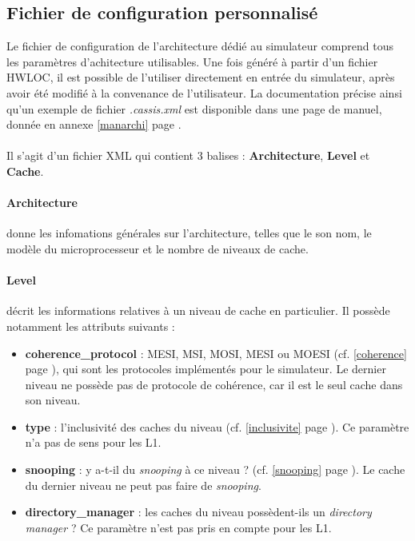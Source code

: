 \subsection{Fichier de configuration personnalisé}
\label{config}
Le fichier de configuration de l'architecture dédié au simulateur comprend tous les paramètres d'achitecture utilisables. Une fois généré à partir d'un fichier \textsf{HWLOC}, il est possible de l'utiliser directement en entrée du simulateur, après avoir été modifié à la convenance de l'utilisateur. La documentation précise ainsi qu'un exemple de fichier \textit{.cassis.xml} est disponible dans une page de manuel, donnée en annexe \ref{manarchi} page \pageref{manarchi}.

\paragraph{}
Il s'agit d'un fichier XML qui contient 3 balises : \textbf{Architecture}, \textbf{Level} et \textbf{Cache}.

\paragraph{Architecture} donne les infomations générales sur l'architecture, telles que le son nom, le modèle du microprocesseur et le nombre de niveaux de cache.

\paragraph{Level} décrit les informations relatives à un niveau de cache en particulier. Il possède notamment les attributs suivants :
\begin{itemize}
  \item \textbf{coherence\_protocol} : MESI, MSI, MOSI, MESI ou MOESI (cf. \ref{coherence} page \pageref{coherence}), qui sont les protocoles implémentés pour le simulateur. Le dernier niveau ne possède pas de protocole de cohérence, car il est le seul cache dans son niveau.
  \item \textbf{type} : l'inclusivité des caches du niveau (cf. \ref{inclusivite} page \pageref{inclusivite}). Ce paramètre n'a pas de sens pour les L1.
  \item \textbf{snooping} : y a-t-il du \emph{snooping} à ce niveau ? (cf. \ref{snooping} page \pageref{snooping}). Le cache du dernier niveau ne peut pas faire de \emph{snooping}.
  \item \textbf{directory\_manager} : les caches du niveau possèdent-ils un \emph{directory manager} ? Ce paramètre n'est pas pris en compte pour les L1.
\end{itemize}

